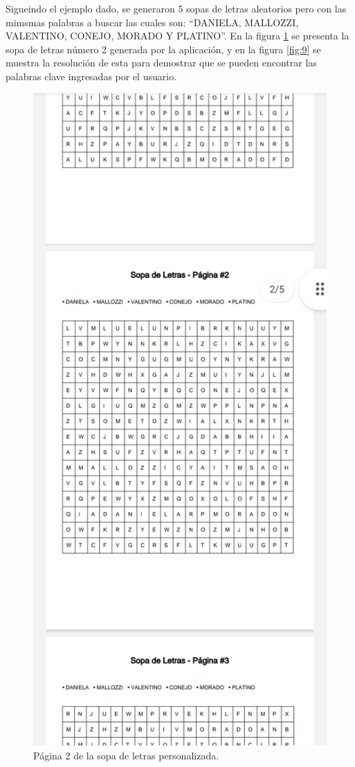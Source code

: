 \documentclass[conference]{IEEEtran}
\begin{document}
Sigueindo el ejemplo dado, se generaron 5 sopas de letras aleatorios pero con las mimsmas palabras a buscar las cuales son: \enquote{DANIELA, MALLOZZI, VALENTINO, CONEJO, MORADO Y PLATINO}. En la figura \ref{fig:8} se presenta la sopa de letras número 2 generada por la aplicación, y en la figura \ref{fig:9}  se muestra la resolución de esta para demostrar que se pueden encontrar las palabras clave ingresadas por el  usuario.


\begin{figure}[H]
    \centering
    \includegraphics[width=0.4\columnwidth]{imagenes/ver_pdf2.png}
    \caption{Página 2 de la sopa de letras personalizada.}
    \label{fig:8}
\end{figure}
\end{document}
